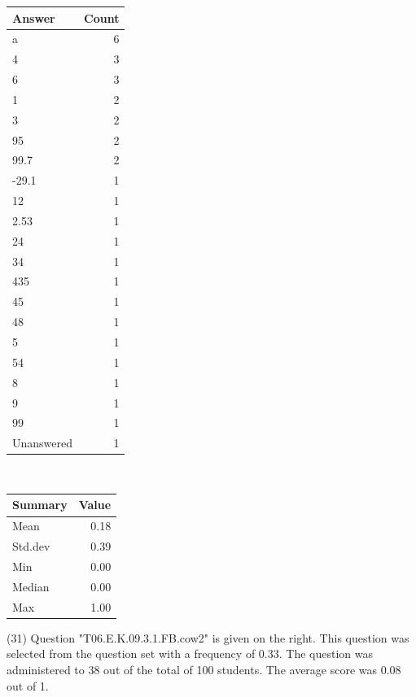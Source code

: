 \documentclass[12pt,nohyper]{tufte-handout}\usepackage[]{graphicx}\usepackage[]{color}
\begin{document}
\begin{center}%
\begin{tabular}{lr}
  \hline
Answer & Count \\ 
  \hline
a &   6 \\ 
  4 &   3 \\ 
  6 &   3 \\ 
  1 &   2 \\ 
  3 &   2 \\ 
  95 &   2 \\ 
  99.7 &   2 \\ 
  -29.1 &   1 \\ 
  12 &   1 \\ 
  2.53 &   1 \\ 
  24 &   1 \\ 
  34 &   1 \\ 
  435 &   1 \\ 
  45 &   1 \\ 
  48 &   1 \\ 
  5 &   1 \\ 
  54 &   1 \\ 
  8 &   1 \\ 
  9 &   1 \\ 
  99 &   1 \\ 
  Unanswered &   1 \\ 
   \hline
\end{tabular}
~~~~~~~~%
\begin{tabular}{lr}
  \hline
Summary & Value \\ 
  \hline
Mean & 0.18 \\ 
  Std.dev & 0.39 \\ 
  Min & 0.00 \\ 
  Median & 0.00 \\ 
  Max & 1.00 \\ 
   \hline
\end{tabular}
\end{center}\newpage{} (31) Question "T06.E.K.09.3.1.FB.cow2" is given on the right. This question was selected from the question set with a frequency of 0.33. The question was administered to 38 out of the total of 100 students. The average score was 0.08 out of 1.
\end{document}
